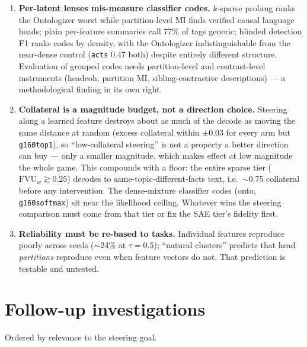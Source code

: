\documentclass[11pt]{article}
\newcommand{\fvu}{\mathrm{FVU}_w}
\begin{document}
\begin{enumerate}
$\mathbb{E}[p]$ --- which decodes to the corpus mean --- and ablations
must pin to it, never to uniform. Hard selection buys more than
categorical form: \texttt{g160top1} is also the best low-magnitude
steerer, $4\times$ the Ontologizer and $8\times$ plain top-$k$ at
$m{=}0.05$. Categorical structure and low-magnitude steerability arrive
together and neither survives softening.
\item \textbf{Per-latent lenses mis-measure classifier codes.} $k$-sparse
probing ranks the Ontologizer worst while partition-level MI finds
verified causal language heads; plain per-feature summaries call 77\% of
tags generic; blinded detection F1 ranks codes by density, with the
Ontologizer indistinguishable from the near-dense control
(\texttt{acts} 0.47 both) despite entirely different structure.
Evaluation of grouped codes needs partition-level and
contrast-level instruments (headcoh, partition MI, sibling-contrastive
descriptions) --- a methodological finding in its own right.
\item \textbf{Collateral is a magnitude budget, not a direction
choice.} Steering along a learned feature destroys about as much of the
decode as moving the same distance at random (excess collateral within
$\pm0.03$ for every arm but \texttt{g160top1}), so ``low-collateral
steering'' is not a property a better direction can buy --- only a
smaller magnitude, which makes effect at low magnitude the whole game.
This compounds with a floor: the entire sparse tier
($\fvu \gtrsim 0.25$) decodes to same-topic-different-facts text, i.e.\
$\sim$0.75 collateral before any intervention. The dense-mixture classifier codes (onto,
\texttt{g160softmax}) sit near the likelihood ceiling. Whatever wins the
steering comparison must come from that tier or fix the SAE tier's
fidelity first.
\item \textbf{Reliability must be re-based to tasks.} Individual features
reproduce poorly across seeds ($\sim$24\% at $\tau{=}0.5$); ``natural
clusters'' predicts that head \emph{partitions} reproduce even when
feature vectors do not. That prediction is testable and untested.
\end{enumerate}

\section{Follow-up investigations}

Ordered by relevance to the steering goal.
\end{document}
